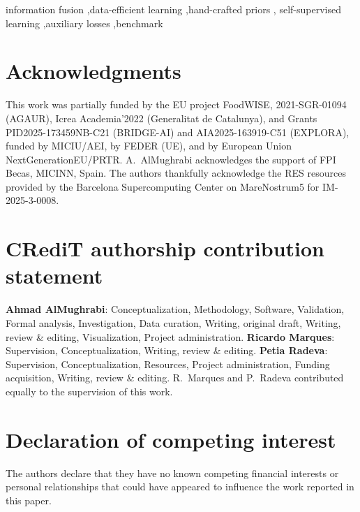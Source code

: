 \documentclass[a4paper,fleqn]{cas-dc}
\begin{document}
\begin{keywords}
information fusion \sep data-efficient learning \sep hand-crafted priors \sep
self-supervised learning \sep auxiliary losses \sep benchmark
\end{keywords}

\maketitle
\sloppy  %








\section*{Acknowledgments}
This work was partially funded by the EU project FoodWISE,
2021-SGR-01094 (AGAUR), Icrea Academia'2022 (Generalitat de Catalunya),
and Grants PID2025-173459NB-C21 (BRIDGE-AI) and AIA2025-163919-C51
(EXPLORA), funded by MICIU/AEI, by FEDER (UE), and by European Union
NextGenerationEU/PRTR. A.~AlMughrabi acknowledges the support of FPI
Becas, MICINN, Spain. The authors thankfully acknowledge the RES
resources provided by the Barcelona Supercomputing Center on
MareNostrum5 for IM-2025-3-0008.

\section*{CRediT authorship contribution statement}
\textbf{Ahmad AlMughrabi}: Conceptualization, Methodology, Software,
Validation, Formal analysis, Investigation, Data curation, Writing,
original draft, Writing, review \& editing, Visualization, Project
administration.
\textbf{Ricardo Marques}: Supervision, Conceptualization, Writing,
review \& editing.
\textbf{Petia Radeva}: Supervision, Conceptualization, Resources,
Project administration, Funding acquisition, Writing, review \&
editing.
R.~Marques and P.~Radeva contributed equally to the supervision of this
work.

\section*{Declaration of competing interest}
The authors declare that they have no known competing financial interests or
personal relationships that could have appeared to influence the work
reported in this paper.
\end{document}
